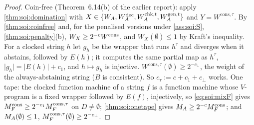 \begin{proof}
Coin-free (Theorem~6.14(b) of the earlier report): apply \cref{thm:soi:domination} with $X\in\{W_{A},W_{A}^{\mathrm{dec}},W_{A}^{\mathrm{chk},t},W_{A}^{\mathrm{gen},t}\}$ and $Y=W^{\mathrm{cons},\tau}$. By \cref{thm:soi:coinfree} and, for the penalised versions under \cref{ass:soi:S}, \cref{thm:soi:penalty}(b), $W_X\ge2^{-c}W^{\mathrm{cons}}$, and $W_X(\emptyset)\le1$ by Kraft's inequality. For a clocked string $h$ let $g_h$ be the wrapper that runs $h^\tau$ and diverges when it abstains, followed by $E(h)$; it computes the same partial map as $h^\tau$, $\lvert g_h\rvert=\lvert E(h)\rvert+c_1$, and $h\mapsto g_h$ is injective. $W^{\mathrm{cons},\tau}(\emptyset)\ge2^{-c_\bot}$, the weight of the always-abstaining string ($B$ is consistent). So $c_\tau:=c+c_1+c_\bot$ works. One tape: the clocked function machine of a string $f$ is a function machine whose $V$-program is a fixed wrapper followed by $E(f)$, injectively, so \eqref{eq:soi:mixF} gives $M_{F}^{\mathrm{cons}}\ge2^{-c_1}M_{F}^{\mathrm{cons},\tau}$ on $D\ne\emptyset$; \cref{thm:soi:onetape} gives $M_{A}\ge2^{-c}M_{F}^{\mathrm{cons}}$; and $M_{A}(\emptyset)\le1$, $M_{F}^{\mathrm{cons},\tau}(\emptyset)\ge2^{-c_\bot}$.
\end{proof}

